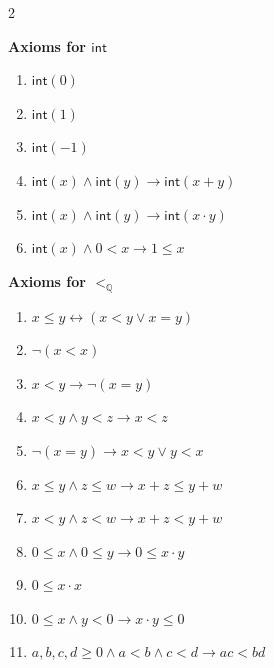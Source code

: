 \documentclass[11pt]{article}
\newcommand{\LAint}{\mathsf{int}}
\theoremstyle{definition}
\theoremstyle{plain}
\theoremstyle{remark}
\newcommand{\bQ}{\mathbb{Q}}
\begin{document}
\begin{multicols}{2}
\begin{enumerate}
    {\item[\phantom{1}] \textbf{Axioms for $\LAint$}
        \begin{enumerate}
            \item[($\text{Int}_1$)] $\LAint(0)$
            \item[($\text{Int}_2$)] $\LAint(1)$
            \item[($\text{Int}_3$)] $\LAint(-1)$
            \item[($\text{Int}_4$)] $\LAint(x) \land \LAint(y) \to \LAint(x + y)$ 
            \item[($\text{Int}_5$)] $\LAint(x) \land \LAint(y) \to \LAint(x \cdot y)$
            \item[($\text{Int}_6$)] $\LAint(x) \land 0 < x \to 1 \leq x$
            
            
        \end{enumerate}}
    {\item[\phantom{1}] \textbf{Axioms for $<_\bQ$}
        \begin{enumerate}
            \item[($\text{Ord}_1$)] $x \leq y \leftrightarrow (x < y \lor x = y)$
            \item[($\text{Ord}_2$)] $\neg (x < x)$
            \item[($\text{Ord}_3$)] $x < y \to \neg (x = y)$
            \item[($\text{Ord}_4$)] $x < y \land y < z \to x < z$
            \item[($\text{Ord}_5$)] $\neg(x = y) \to x < y \lor y < x$

            \item[($\text{Ord}_6$)] $x \leq y \land z \leq w \to x + z \leq y + w$
            \item[($\text{Ord}_{6'}$)] $x < y \land z < w \to x + z < y + w$
            \item[($\text{Ord}_7$)] $0 \leq x \land 0 \leq y \to 0 \leq x \cdot y$
            \item[($\text{Ord}_8$)]  $0 \leq x \cdot x$
            \item[($\text{Ord}_9$)]  $0 \leq x \land y < 0 \to x \cdot y \leq 0$
            \item[($\text{Ord}_{10}$)]  $a, b, c, d \geq 0 \land a < b \land c < d \to ac < bd$
        \end{enumerate}}
\end{enumerate}
\end{multicols}
\end{document}
